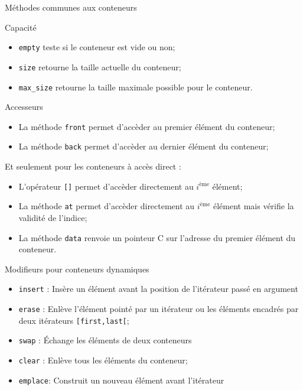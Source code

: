 \documentclass[handout,10pt]{beamer}
\begin{document}
\begin{frame}[fragile]{Méthodes communes aux conteneurs} 
\tiny
\begin{exampleblock}{Capacité}
\begin{itemize}
 \item \lstinline$empty$ teste si le conteneur est vide ou non;
 \item \lstinline$size$ retourne la taille actuelle du conteneur;
 \item \lstinline$max_size$ retourne la taille maximale possible pour le conteneur.
\end{itemize}
\end{exampleblock}

\begin{block}{Accesseurs}
\begin{itemize}
 \item La méthode  \lstinline$front$ permet d'accèder au premier élément du conteneur;
 \item La méthode \lstinline$back$ permet d'accèder au dernier élément du conteneur;
\end{itemize}
Et seulement pour les conteneurs à accès direct :
\begin{itemize}
 \item L'opérateur \lstinline$[]$ permet d'accèder directement au $i^{\mbox{ème}}$ élément;
 \item La méthode \lstinline$at$ permet d'accèder directement au $i^{\mbox{ème}}$ élément mais vérifie la validité de l'indice;
 \item La méthode \lstinline$data$ renvoie un pointeur C sur l'adresse du premier élément du conteneur.
\end{itemize}
\end{block}

\begin{alertblock}{Modifieurs pour conteneurs dynamiques}
\begin{itemize}
 \item \lstinline$insert$ : Insère un élément avant la position de l'itérateur passé en argument
 \item \lstinline$erase$  : Enlève l'élément pointé par un itérateur ou les éléments encadrés par deux itérateurs \lstinline$[first,last[$;
 \item \lstinline$swap$   : \'Echange les éléments de deux conteneurs
 \item \lstinline$clear$  : Enlève tous les éléments du conteneur;
 \item \lstinline$emplace$: Construit un nouveau élément avant l'itérateur
\end{itemize}
\end{alertblock}
\end{frame}
\end{document}
